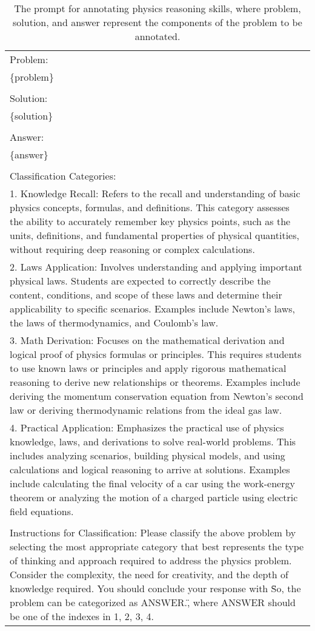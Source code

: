 \begin{table}[b]
    \centering
    \footnotesize
    \caption{The prompt for annotating physics reasoning skills, where {problem}, {solution}, and {answer} represent the components of the problem to be annotated.}
    \begin{tabularx}{\textwidth}{|X|}
        \hline
        Problem: \\
        \{problem\} \\ \\
        Solution: \\ 
        \{solution\} \\ \\ 
        Answer: \\ 
        \{answer\} \\ \\
        Classification Categories: \\
        1. Knowledge Recall: Refers to the recall and understanding of basic physics concepts, formulas, and definitions. This category assesses the ability to accurately remember key physics points, such as the units, definitions, and fundamental properties of physical quantities, without requiring deep reasoning or complex calculations. \\
        2. Laws Application: Involves understanding and applying important physical laws. Students are expected to correctly describe the content, conditions, and scope of these laws and determine their applicability to specific scenarios. Examples include Newton's laws, the laws of thermodynamics, and Coulomb's law. \\ 
        3. Math Derivation: Focuses on the mathematical derivation and logical proof of physics formulas or principles. This requires students to use known laws or principles and apply rigorous mathematical reasoning to derive new relationships or theorems. Examples include deriving the momentum conservation equation from Newton's second law or deriving thermodynamic relations from the ideal gas law. \\
        4. Practical Application: Emphasizes the practical use of physics knowledge, laws, and derivations to solve real-world problems. This includes analyzing scenarios, building physical models, and using calculations and logical reasoning to arrive at solutions. Examples include calculating the final velocity of a car using the work-energy theorem or analyzing the motion of a charged particle using electric field equations. \\ \\
        Instructions for Classification: Please classify the above problem by selecting the most appropriate category that best represents the type of thinking and approach required to address the physics problem. Consider the complexity, the need for creativity, and the depth of knowledge required. You should conclude your response with \"So, the problem can be categorized as ANSWER.\", where ANSWER should be one of the indexes in 1, 2, 3, 4. 
        \\
        \hline
    \end{tabularx}
    \label{tabapp: skill_prompt}
\end{table}


